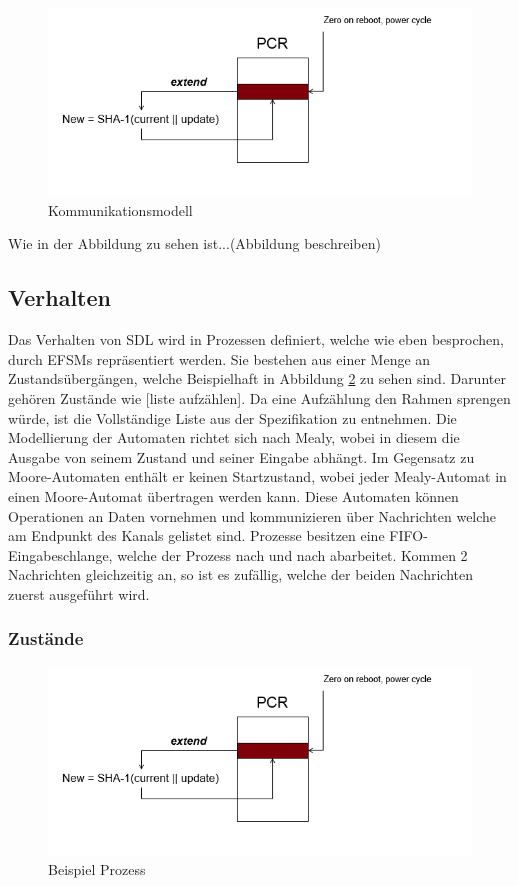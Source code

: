 \begin{figure}[ht]
	\centering
	\includegraphics[width=1\textwidth]{test.png}
	\caption{Kommunikationsmodell}
	\label{fig:KommModell}
\end{figure}

Wie in der Abbildung zu sehen ist...(Abbildung beschreiben)


\subsection{Verhalten}
\label{ssc:Verhalten}
Das Verhalten von \ac{SDL} wird in Prozessen definiert, welche wie eben besprochen, durch \ac{EFSM}s repräsentiert werden. Sie bestehen aus einer Menge an Zustandsübergängen, welche Beispielhaft in Abbildung \ref{fig:BspProzess} zu sehen sind. Darunter gehören Zustände wie [liste aufzählen]. Da eine Aufzählung den Rahmen sprengen würde, ist die Vollständige Liste aus der Spezifikation zu entnehmen. 
Die Modellierung der Automaten richtet sich nach Mealy, wobei in diesem die Ausgabe von seinem Zustand und seiner Eingabe abhängt.
Im Gegensatz zu Moore-Automaten enthält er keinen Startzustand, wobei jeder Mealy-Automat in einen Moore-Automat übertragen werden kann.
Diese Automaten können Operationen an Daten vornehmen und kommunizieren über Nachrichten welche am Endpunkt des Kanals gelistet sind. Prozesse besitzen eine \ac{FIFO}-Eingabeschlange, welche der Prozess nach und nach abarbeitet. Kommen 2 Nachrichten gleichzeitig an, so ist es zufällig, welche der beiden Nachrichten zuerst ausgeführt wird. 

\subsubsection{Zustände}
\label{sssc:Verhalten}

\begin{figure}[ht]
	\centering
	\includegraphics[width=1\textwidth]{test.png}
	\caption{Beispiel Prozess}
	\label{fig:BspProzess}
\end{figure}

